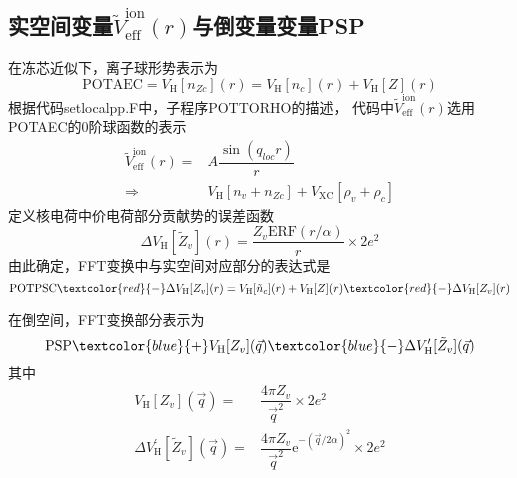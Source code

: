 \subsection{实空间变量$\tilde V_{\mathrm{eff}}^{\mathrm{ion}}(r)$与倒变量变量\textrm{PSP}}
在冻芯近似下，离子球形势表示为
\begin{equation}
	\mathrm{POTAEC} = V_{\mathrm{H}}[n_{Zc}](r)= V_{\mathrm{H}}[n_c](r)+V_{\mathrm{H}}[Z](r) 
	\label{eq:POTAEC}
\end{equation}
根据代码\textrm{setlocalpp.F}中，子程序\textrm{POTTORHO}的描述，
代码中$\tilde V_{\mathrm{eff}}^{\mathrm{ion}}(r)$选用\textrm{POTAEC}的0阶球函数的表示
\begin{equation}
	\begin{aligned}
		\tilde V_{\mathrm{eff}}^{\mathrm{ion}}(r)=&A\dfrac{\sin(q_{loc}r)}r\\
		\Rightarrow & V_{\mathrm{H}}[n_v+n_{Zc}]+V_{\mathrm{XC}}[\rho_v+\rho_c]
	\end{aligned}
	\label{eq:POT_ION}
\end{equation}
定义核电荷中价电荷部分贡献势的误差函数
\begin{equation}
	\Delta V_{\mathrm{H}}[\tilde{Z}_v](r)=\dfrac{Z_v\mathrm{ERF}(r/\alpha)}r\times2e^2
	\label{eq:Delta_Z_valence}
\end{equation}
由此确定，\textrm{FFT}变换中与实空间对应部分的表达式是
\begin{displaymath}
	\mathrm{POTPSC} \textcolor{red}{-} \Delta V_{\mathrm{H}}[Z_v](r) = V_{\mathrm{H}}[\tilde{n}_c](r)+V_{\mathrm{H}}[Z](r) \textcolor{red}{-} \Delta V_{\mathrm{H}}[Z_v](r)
\end{displaymath}

在倒空间，\textrm{FFT}变换部分表示为
\begin{displaymath}
	\mathrm{PSP} \textcolor{blue}{+} V_{\mathrm{H}}[Z_v](\vec{q}) \textcolor{blue}{-} \Delta V_{\mathrm{H}}^{\prime}[\tilde{Z}_v](\vec q)
\end{displaymath}
其中
\begin{displaymath}
	\begin{aligned}
		V_{\mathrm{H}}[Z_v](\vec q)=&\dfrac{4\pi Z_v}{\vec q^2}\times2e^2\\
		\Delta V_{\mathrm{H}}^{\prime}[\tilde{Z}_v](\vec q)=&\dfrac{4\pi Z_v}{\vec q^2}\mathrm{e}^{-(\vec q/2\alpha)^2}\times2e^2
	\end{aligned}
\end{displaymath}

